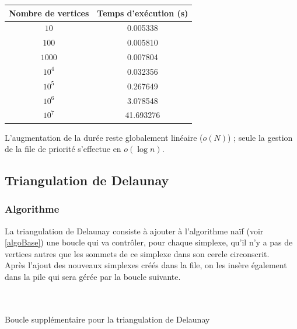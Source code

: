 \documentclass{article}
\begin{document}
        \begin{center}
            \begin{tabular}{|c|c|}\hline \label{tempsBasique}
                Nombre de vertices & Temps d'exécution (s) \\
                \hline
                $10$ & 0.005338 \\
                $100$ & 0.005810 \\
                $1000$ & 0.007804 \\
                $10^4$ & 0.032356 \\
                $10^5$ & 0.267649 \\
                $10^6$ & 3.078548 \\
                $10^7$ & 41.693276 \\
                \hline
            \end{tabular}
        \end{center}
        
        
        L'augmentation de la durée reste globalement linéaire ($o(N)$) ; seule la gestion de la file de priorité s'effectue en $o(\log{n})$.

    \subsection{Triangulation de Delaunay}
        \subsubsection{Algorithme}
        
        La triangulation de Delaunay consiste à ajouter à l'algorithme naïf (voir \ref{algoBase}) une boucle qui va contrôler, pour chaque simplexe, qu'il n'y a pas de vertices autres que les sommets de ce simplexe dans son cercle circonscrit.
        \\Après l'ajout des nouveaux simplexes créés dans la file, on les insère également dans la pile qui sera gérée par la boucle suivante.
        
        \paragraph{}
        \begin{algorithm}[H]
            \label{algoDelaunay}
             \\
            \caption{Boucle supplémentaire pour la triangulation de Delaunay}
       \end{algorithm}
       
\end{document}

